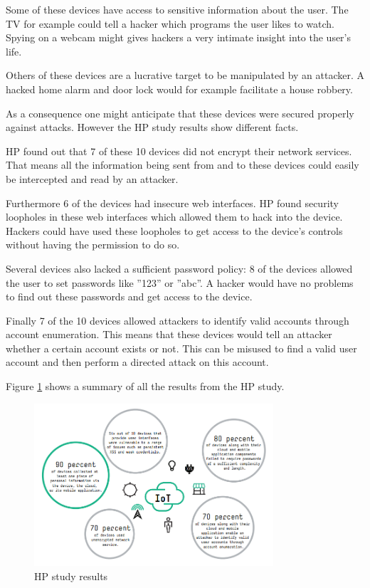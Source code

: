 \documentclass[conference]{IEEEtran}
\begin{document}
Some of these devices have access to sensitive information about the user. The 
TV for example could tell a hacker which programs the user likes to watch. 
Spying on a webcam might gives hackers a very intimate insight into the user's 
life.

Others of these devices are a lucrative target to be manipulated by an 
attacker. A hacked home alarm and door lock would for example facilitate a 
house robbery. 

As a consequence one might anticipate that these devices were secured properly 
against attacks. However the HP study results show different facts.

HP found out that 7 of these 10 devices did not encrypt their network services. 
That means all the information being sent from and to these devices could easily
be intercepted and read by an attacker. 

Furthermore 6 of the devices had insecure web interfaces. HP found security 
loopholes in these web interfaces which allowed them to hack into the device. 
Hackers could have used these loopholes to get access to the device's controls 
without having the permission to do so. 

Several devices also lacked a sufficient password policy: 8 of the devices 
allowed the user to set passwords like ''123'' or ''abc''. A hacker would 
have no problems to find out these passwords and get access to the device.

Finally 7 of the 10 devices allowed attackers to identify valid accounts 
through account enumeration. This means that these devices would tell an 
attacker whether a certain account exists or not. This can be misused to find 
a valid user account and then perform a directed attack on this account. 

Figure \ref{HPStudyresults} shows a summary of all the results from the HP 
study.

\begin{figure}[!t]
\centering
\includegraphics[width=3.5in]{./img/hpStudy1.png}
\caption{HP study results}
\label{HPStudyresults}
\end{figure}
\end{document}
